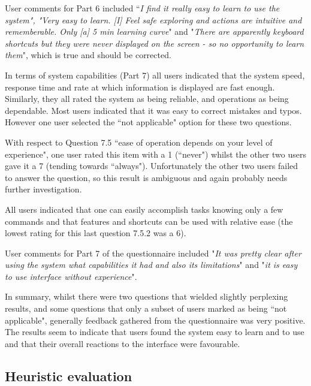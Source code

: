 User comments for Part 6 included ``\textit{I find it really easy to learn to use the system", "Very easy to learn. [I] Feel safe exploring and actions are intuitive and rememberable. Only [a] 5 min learning curve}" and "\textit{There are apparently keyboard shortcuts but they were never displayed on the screen - so no opportunity to learn them}", which is true and should be corrected.

In terms of system capabilities (Part 7) all users indicated that the system speed, response time and rate at which information is displayed are fast enough. Similarly, they all rated the system as being reliable, and operations as being dependable. Most users indicated that it was easy to correct mistakes and typos.  However one user selected the ``not applicable" option for these two questions. 

With respect to Question 7.5 ``ease of operation depends on your level of experience", one user rated this item with a 1 (``never") whilst the other two users gave it a 7 (tending towards ``always"). Unfortunately the other two users failed to answer the question, so this result is ambiguous and again probably needs further investigation. 

All users indicated that one can easily accomplish tasks knowing only a few commands and that features and shortcuts can be used with relative ease (the lowest rating for this last question 7.5.2 was a 6).

User comments for Part 7 of the questionnaire included "\textit{It was pretty clear after using the system what capabilities it had and also its limitations}" and "\textit{it is easy to use interface without experience}".

In summary, whilst there were two questions that wielded slightly perplexing results, and some questions that only a subset of users marked as being ``not applicable", generally feedback gathered from the questionnaire was very positive. The results seem to indicate that users found the system easy to learn and to use and that their overall reactions to the interface were favourable. 

\subsection{Heuristic evaluation}

